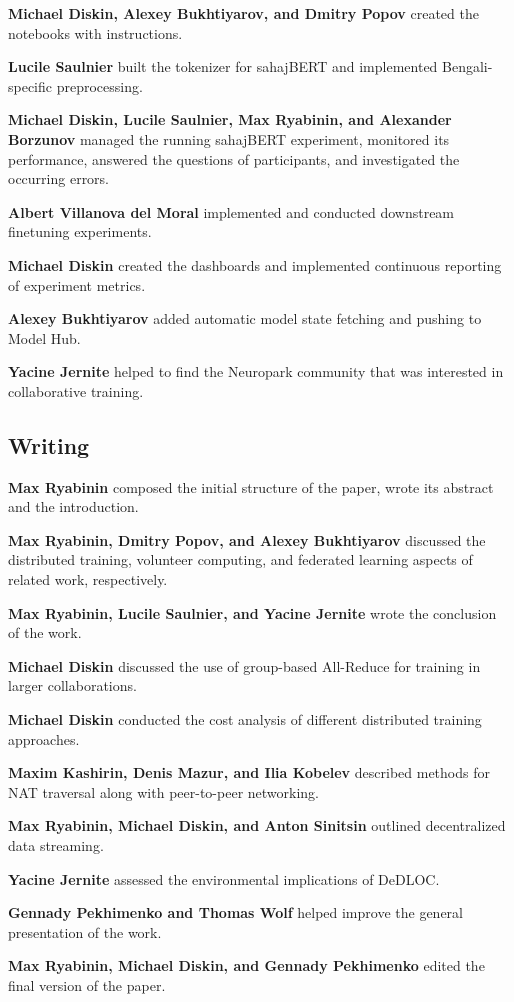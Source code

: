 \textbf{Michael Diskin, Alexey Bukhtiyarov, and Dmitry Popov} created the notebooks with instructions.

\textbf{Lucile Saulnier} built the tokenizer for sahajBERT and implemented Bengali-specific preprocessing.

\textbf{Michael Diskin, Lucile Saulnier, Max Ryabinin, and Alexander Borzunov} managed the running sahajBERT experiment, monitored its performance, answered the questions of participants, and investigated the occurring errors.

\textbf{Albert Villanova del Moral} implemented and conducted downstream finetuning experiments.

\textbf{Michael Diskin} created the dashboards and implemented continuous reporting of experiment metrics.

\textbf{Alexey Bukhtiyarov} added automatic model state fetching and pushing to Model Hub.

\textbf{Yacine Jernite} helped to find the Neuropark community that was interested in collaborative training. 

\vspace{-2pt}
\subsection*{Writing}

\textbf{Max Ryabinin} composed the initial structure of the paper, wrote its abstract and the introduction.

\textbf{Max Ryabinin, Dmitry Popov, and Alexey Bukhtiyarov} discussed the distributed training, volunteer computing, and federated learning aspects of related work, respectively.

\textbf{Max Ryabinin, Lucile Saulnier, and Yacine Jernite} wrote the conclusion of the work.

\textbf{Michael Diskin} discussed the use of group-based All-Reduce for training in larger collaborations.

\textbf{Michael Diskin} conducted the cost analysis of different distributed training approaches.

\textbf{Maxim Kashirin, Denis Mazur, and Ilia Kobelev} described methods for NAT traversal along with peer-to-peer networking.

\textbf{Max Ryabinin, Michael Diskin, and Anton Sinitsin} outlined decentralized data streaming.

\textbf{Yacine Jernite} assessed the environmental implications of DeDLOC.

\textbf{Gennady Pekhimenko and Thomas Wolf} helped improve the general presentation of the work.

\textbf{Max Ryabinin, Michael Diskin, and Gennady Pekhimenko} edited the final version of the paper.